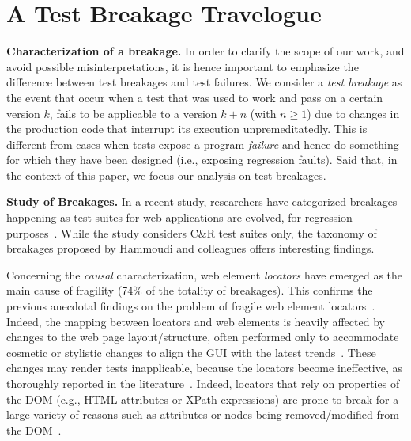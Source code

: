 \section{A Test Breakage Travelogue}\label{sec:breakage-travelogue}

\noindent
\textbf{Characterization of a breakage.}
In order to clarify the scope of our work, and avoid possible misinterpretations, it is hence important to emphasize the difference between test breakages and test failures. We consider a \textit{test breakage} as the event that occur when a test that was used to work and pass on a certain version $k$, fails to be applicable to a version $k+n$ (with $n \geq 1$) due to changes in the production code that interrupt its execution unpremeditatedly. %
This is different from cases when tests expose a program \textit{failure} and hence do something for which they have been designed (i.e., exposing regression faults).
Said that, in the context of this paper, we focus our analysis on test breakages.

\noindent
\textbf{Study of Breakages.}
In a recent study, researchers have categorized breakages happening as test suites for web applications are evolved, for regression purposes~\cite{Hammoudi-2016-ICST}. While the study considers C\&R test suites only, the taxonomy of breakages proposed by Hammoudi and colleagues offers interesting findings. 

Concerning the \textit{causal} characterization, web element \textit{locators} have emerged as the main cause of fragility (74\% of the totality of breakages). %
%
This confirms the previous anecdotal findings on the problem of fragile web element locators~\cite{2016-Leotta-JSEP,2014-leotta-WoSAR,Daniel:2011:AGR:2002931.2002937,2013-Ricca-wse}.
%
Indeed, the mapping between locators and web elements is heavily affected by changes to the web page layout/structure, often performed only to accommodate cosmetic or stylistic changes to align the GUI with the latest trends~\cite{2016-leotta-Advances,2016-Leotta-JSEP}. These changes may render tests inapplicable, because the locators become ineffective, as thoroughly reported in the literature~\cite{2016-leotta-Advances,2016-Leotta-JSEP,Choudhary:2011:WWA:2002931.2002935,Hammoudi-2016-ICST,2013-Ricca-wse}. 
Indeed, locators that rely on properties of the DOM (e.g., HTML attributes or XPath expressions) are prone to break for a large variety of reasons such as attributes or nodes being removed/modified from the DOM~\cite{Choudhary:2011:WWA:2002931.2002935}.

